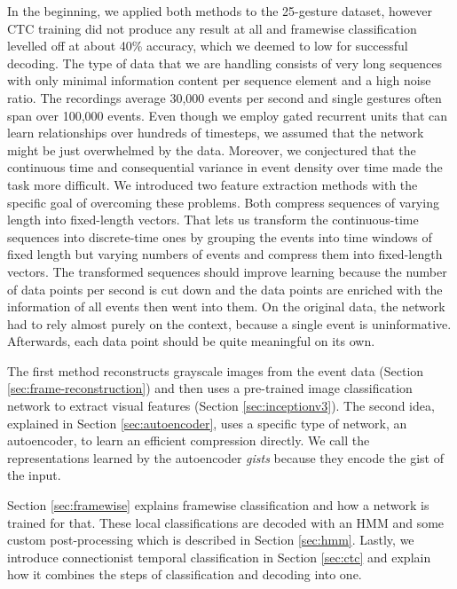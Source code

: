 In the beginning, we applied both methods to the 25-gesture dataset, however CTC
training did not produce any result at all and framewise classification levelled
off at about 40\% accuracy, which we deemed to low for successful decoding. The
type of data that we are handling consists of very long sequences with only
minimal information content per sequence element and a high noise ratio. The
recordings average 30,000 events per second and single gestures often span over
100,000 events. Even though we employ gated recurrent units that can learn
relationships over hundreds of timesteps, we assumed that the network might be
just overwhelmed by the data. Moreover, we conjectured that the continuous time
and consequential variance in event density over time made the task more
difficult. We introduced two feature extraction methods with the specific goal
of overcoming these problems. Both compress sequences of varying length into
fixed-length vectors. That lets us transform the continuous-time sequences into
discrete-time ones by grouping the events into time windows of fixed length but
varying numbers of events and compress them into fixed-length vectors. The
transformed sequences should improve learning because the number of data points
per second is cut down and the data points are enriched with the information of
all events then went into them. On the original data, the network had to rely
almost purely on the context, because a single event is uninformative.
Afterwards, each data point should be quite meaningful on its own.


The first method reconstructs grayscale images from the event data (Section
\ref{sec:frame-reconstruction}) and then uses a pre-trained image classification
network to extract visual features (Section \ref{sec:inceptionv3}). The second
idea, explained in Section \ref{sec:autoencoder}, uses a specific type of
network, an autoencoder, to learn an efficient compression directly. We call the
representations learned by the autoencoder \emph{gists} because they encode the
gist of the input.

Section \ref{sec:framewise} explains framewise classification and how a network
is trained for that. These local classifications are decoded with an HMM and
some custom post-processing which is described in Section \ref{sec:hmm}. Lastly,
we introduce connectionist temporal classification in Section \ref{sec:ctc} and
explain how it combines the steps of classification and decoding into one.

